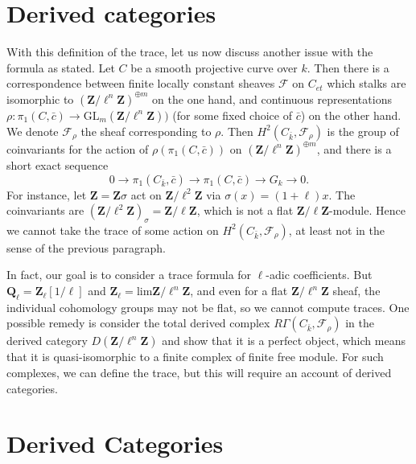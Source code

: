\section{Derived categories}

With this definition of the trace, let us now discuss another issue with the 
formula as stated. Let $C$ be a smooth projective curve over $k$. Then there is 
a correspondence between finite locally constant sheaves $\mathcal{F}$ on 
$C_{et}$ which stalks are isomorphic to 
${(\mathbf{Z}/\ell^n\mathbf{Z})}^{\oplus m}$ on the one hand, and continuous 
representations $\rho : \pi_1 (C,\bar c) \to 
\text{GL}_m(\mathbf{Z}/\ell^n\mathbf{Z}))$ (for some fixed choice of $\bar c$) 
on the other hand. We denote $\mathcal{F}_\rho$ the sheaf corresponding to 
$\rho$. Then $H^2 (C_{\bar k}, \mathcal{F}_\rho)$ is the group of coinvariants 
for the action of $\rho(\pi_1 (C,\bar c))$ on 
${(\mathbf{Z}/\ell^n\mathbf{Z})}^{\oplus m}$, and there is a short exact 
sequence
$$
0 \longrightarrow \pi_1 (C_{\bar k},\bar c)  \longrightarrow \pi_1 (C,\bar c)  
\longrightarrow G_k  \longrightarrow 0.
$$
For instance, let $\mathbf{Z} = \mathbf{Z} \sigma$ act on 
$\mathbf{Z}/\ell^2\mathbf{Z}$ via $\sigma(x) = (1+\ell) x$. The coinvariants 
are $(\mathbf{Z}/\ell^2\mathbf{Z})_{\sigma} = \mathbf{Z}/\ell\mathbf{Z}$, which 
is not a flat $\mathbf{Z}/\ell\mathbf{Z}$-module. Hence we cannot take the 
trace of some action on $H^2(C_{\bar k}, \mathcal{F}_\rho)$, at least not in 
the sense of the previous paragraph. 

In fact, our goal is to consider a trace formula for $\ell$-adic coefficients. 
But $\mathbf{Q}_\ell = \mathbf{Z}_\ell[1/\ell]$ and $\mathbf{Z}_\ell = 
\text{lim} \mathbf{Z}/\ell^n\mathbf{Z}$, and even for a flat 
$\mathbf{Z}/\ell^n\mathbf{Z}$ sheaf, the individual cohomology groups may not 
be flat, so we cannot compute traces. One possible remedy is consider the total 
derived complex $R\Gamma(C_{\bar k}, \mathcal{F}_\rho)$ in the derived category 
$D(\mathbf{Z}/\ell^n\mathbf{Z})$ and show that it is a perfect object, which 
means that it is quasi-isomorphic to a finite complex of finite free module. 
For such complexes, we can define the trace, but this will require an account 
of derived categories.

\section{Derived Categories}

